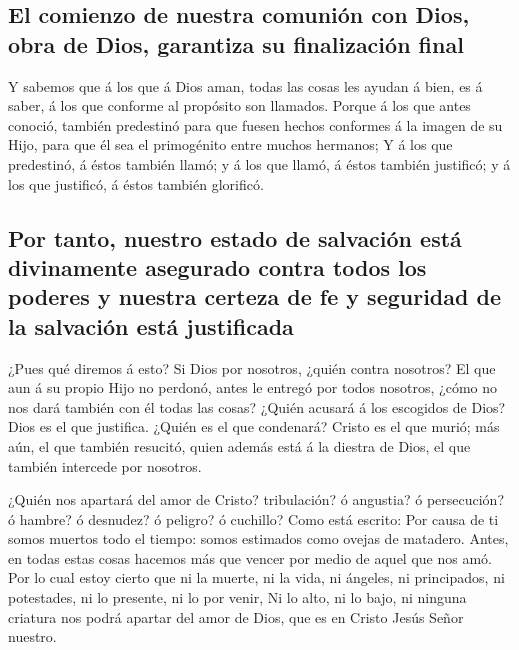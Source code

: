 \hypertarget{el-comienzo-de-nuestra-comuniuxf3n-con-dios-obra-de-dios-garantiza-su-finalizaciuxf3n-final}{%
\subsection{El comienzo de nuestra comunión con Dios, obra de Dios,
garantiza su finalización
final}\label{el-comienzo-de-nuestra-comuniuxf3n-con-dios-obra-de-dios-garantiza-su-finalizaciuxf3n-final}}

 Y sabemos que á los que á Dios aman, todas las cosas les
ayudan á bien, es á saber, á los que conforme al propósito son llamados.
 Porque á los que antes conoció, también predestinó para
que fuesen hechos conformes á la imagen de su Hijo, para que él sea el
primogénito entre muchos hermanos;  Y á los que predestinó,
á éstos también llamó; y á los que llamó, á éstos también justificó; y á
los que justificó, á éstos también glorificó.

\hypertarget{por-tanto-nuestro-estado-de-salvaciuxf3n-estuxe1-divinamente-asegurado-contra-todos-los-poderes-y-nuestra-certeza-de-fe-y-seguridad-de-la-salvaciuxf3n-estuxe1-justificada}{%
\subsection{Por tanto, nuestro estado de salvación está divinamente
asegurado contra todos los poderes y nuestra certeza de fe y seguridad
de la salvación está
justificada}\label{por-tanto-nuestro-estado-de-salvaciuxf3n-estuxe1-divinamente-asegurado-contra-todos-los-poderes-y-nuestra-certeza-de-fe-y-seguridad-de-la-salvaciuxf3n-estuxe1-justificada}}

 ¿Pues qué diremos á esto? Si Dios por nosotros, ¿quién
contra nosotros?  El que aun á su propio Hijo no perdonó,
antes le entregó por todos nosotros, ¿cómo no nos dará también con él
todas las cosas?  ¿Quién acusará á los escogidos de Dios?
Dios es el que justifica.  ¿Quién es el que condenará?
Cristo es el que murió; más aún, el que también resucitó, quien además
está á la diestra de Dios, el que también intercede por nosotros.

 ¿Quién nos apartará del amor de Cristo? tribulación? ó
angustia? ó persecución? ó hambre? ó desnudez? ó peligro? ó cuchillo?
 Como está escrito: Por causa de ti somos muertos todo el
tiempo: somos estimados como ovejas de matadero.  Antes, en
todas estas cosas hacemos más que vencer por medio de aquel que nos amó.
 Por lo cual estoy cierto que ni la muerte, ni la vida, ni
ángeles, ni principados, ni potestades, ni lo presente, ni lo por venir,
 Ni lo alto, ni lo bajo, ni ninguna criatura nos podrá
apartar del amor de Dios, que es en Cristo Jesús Señor nuestro.

